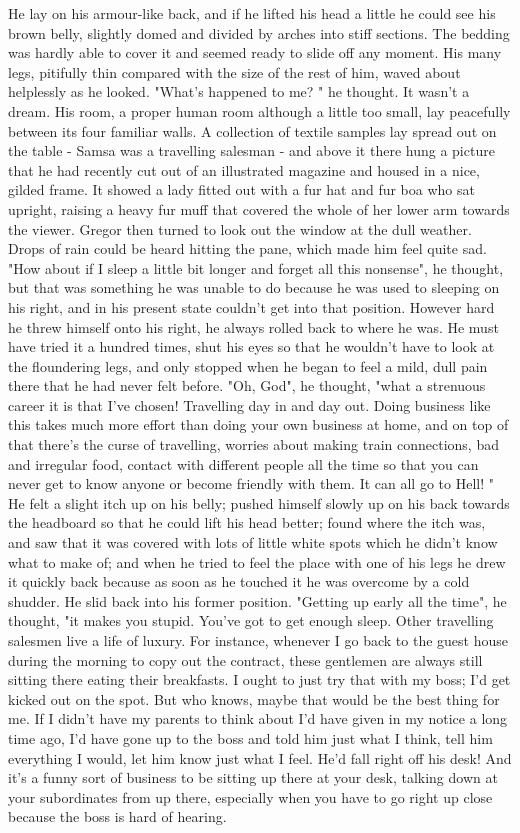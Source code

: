 \documentclass[
	listoffigures, 	%
	listoftables 	%
]{ifathesis}
\begin{document}
He lay on his armour-like back, and if he lifted his head a little he could see his brown belly, slightly domed and divided by arches into stiff sections. The bedding was hardly able to cover it and seemed ready to slide off any moment. His many legs, pitifully thin compared with the size of the rest of him, waved about helplessly as he looked. "What's happened to me? " he thought. It wasn't a dream. His room, a proper human room although a little too small, lay peacefully between its four familiar walls. A collection of textile samples lay spread out on the table - Samsa was a travelling salesman - and above it there hung a picture that he had recently cut out of an illustrated magazine and housed in a nice, gilded frame. It showed a lady fitted out with a fur hat and fur boa who sat upright, raising a heavy fur muff that covered the whole of her lower arm towards the viewer. Gregor then turned to look out the window at the dull weather. Drops of rain could be heard hitting the pane, which made him feel quite sad. "How about if I sleep a little bit longer and forget all this nonsense", he thought, but that was something he was unable to do because he was used to sleeping on his right, and in his present state couldn't get into that position. However hard he threw himself onto his right, he always rolled back to where he was. He must have tried it a hundred times, shut his eyes so that he wouldn't have to look at the floundering legs, and only stopped when he began to feel a mild, dull pain there that he had never felt before. "Oh, God", he thought, "what a strenuous career it is that I've chosen! Travelling day in and day out. Doing business like this takes much more effort than doing your own business at home, and on top of that there's the curse of travelling, worries about making train connections, bad and irregular food, contact with different people all the time so that you can never get to know anyone or become friendly with them. It can all go to Hell! " He felt a slight itch up on his belly; pushed himself slowly up on his back towards the headboard so that he could lift his head better; found where the itch was, and saw that it was covered with lots of little white spots which he didn't know what to make of; and when he tried to feel the place with one of his legs he drew it quickly back because as soon as he touched it he was overcome by a cold shudder. He slid back into his former position. "Getting up early all the time", he thought, "it makes you stupid. You've got to get enough sleep. Other travelling salesmen live a life of luxury. For instance, whenever I go back to the guest house during the morning to copy out the contract, these gentlemen are always still sitting there eating their breakfasts. I ought to just try that with my boss; I'd get kicked out on the spot. But who knows, maybe that would be the best thing for me. If I didn't have my parents to think about I'd have given in my notice a long time ago, I'd have gone up to the boss and told him just what I think, tell him everything I would, let him know just what I feel. He'd fall right off his desk! And it's a funny sort of business to be sitting up there at your desk, talking down at your subordinates from up there, especially when you have to go right up close because the boss is hard of hearing. 
\end{document}
